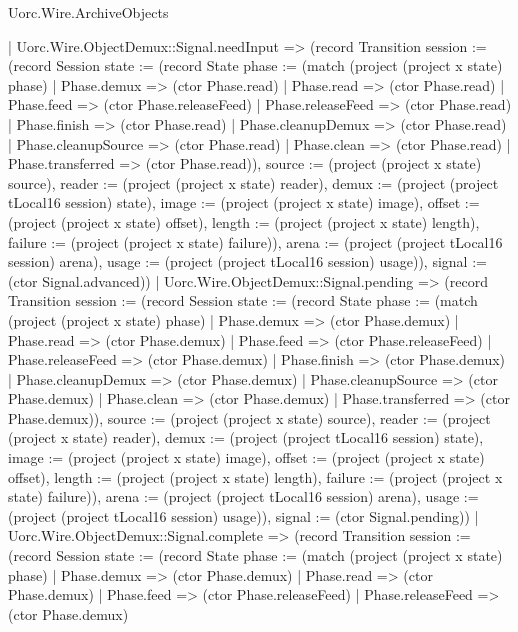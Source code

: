\begin{lexlean}{Uorc.Wire.ArchiveObjects}
\begin{semanticmodule}
{          | Uorc.Wire.ObjectDemux::Signal.needInput => (record Transition {session := (record Session {state := (record State {phase := (match (project (project x state) phase)
            | Phase.demux => (ctor Phase.read)
            | Phase.read => (ctor Phase.read)
            | Phase.feed => (ctor Phase.releaseFeed)
            | Phase.releaseFeed => (ctor Phase.read)
            | Phase.finish => (ctor Phase.read)
            | Phase.cleanupDemux => (ctor Phase.read)
            | Phase.cleanupSource => (ctor Phase.read)
            | Phase.clean => (ctor Phase.read)
            | Phase.transferred => (ctor Phase.read)), source := (project (project x state) source), reader := (project (project x state) reader), demux := (project (project tLocal16 session) state), image := (project (project x state) image), offset := (project (project x state) offset), length := (project (project x state) length), failure := (project (project x state) failure)}), arena := (project (project tLocal16 session) arena), usage := (project (project tLocal16 session) usage)}), signal := (ctor Signal.advanced)})
          | Uorc.Wire.ObjectDemux::Signal.pending => (record Transition {session := (record Session {state := (record State {phase := (match (project (project x state) phase)
            | Phase.demux => (ctor Phase.demux)
            | Phase.read => (ctor Phase.demux)
            | Phase.feed => (ctor Phase.releaseFeed)
            | Phase.releaseFeed => (ctor Phase.demux)
            | Phase.finish => (ctor Phase.demux)
            | Phase.cleanupDemux => (ctor Phase.demux)
            | Phase.cleanupSource => (ctor Phase.demux)
            | Phase.clean => (ctor Phase.demux)
            | Phase.transferred => (ctor Phase.demux)), source := (project (project x state) source), reader := (project (project x state) reader), demux := (project (project tLocal16 session) state), image := (project (project x state) image), offset := (project (project x state) offset), length := (project (project x state) length), failure := (project (project x state) failure)}), arena := (project (project tLocal16 session) arena), usage := (project (project tLocal16 session) usage)}), signal := (ctor Signal.pending)})
          | Uorc.Wire.ObjectDemux::Signal.complete => (record Transition {session := (record Session {state := (record State {phase := (match (project (project x state) phase)
            | Phase.demux => (ctor Phase.demux)
            | Phase.read => (ctor Phase.demux)
            | Phase.feed => (ctor Phase.releaseFeed)
            | Phase.releaseFeed => (ctor Phase.demux)
}}}}
\end{semanticmodule}
\end{lexlean}
